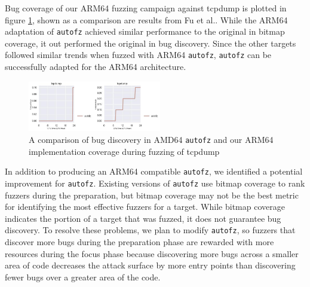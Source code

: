 Bug coverage of our ARM64 fuzzing campaign against tcpdump is plotted in figure \ref{figs:tcp_compare_orig_arm64_ub.png}, 
shown as a comparison are results from Fu et al.\cite{fu_autofz_2023}. While the ARM64 adaptation of \texttt{autofz} achieved similar
performance to the original in bitmap coverage, it out performed the original in bug discovery. Since the other targets followed similar trends
when fuzzed with ARM64 \texttt{autofz}, \texttt{autofz} can be successfully adapted for the ARM64 architecture.

\begin{figure}
    \includegraphics[width=0.52\textwidth]{figs/tcpdump_compare_orig_arm64_ub.png}
    \centering
    \caption{A comparison of bug discovery in AMD64 \texttt{autofz} and our ARM64 implementation
    coverage during fuzzing of tcpdump}
    \label{figs:tcp_compare_orig_arm64_ub.png}
\end{figure}

In addition to producing an ARM64 compatible \texttt{autofz}, we identified a potential improvement for \texttt{autofz}.
Existing versions of \texttt{autofz} use bitmap coverage to rank fuzzers during the preparation, but bitmap
coverage may not be the best metric for identifying the most effective fuzzers for a target. While
bitmap coverage indicates the portion of a target that was fuzzed, it does not guarantee bug discovery.
To resolve these problems, we plan to modify \texttt{autofz}, so fuzzers that discover more bugs during the
preparation phase are rewarded with more resources during the focus phase because discovering more bugs
across a smaller area of code decreases the attack surface by more entry points than discovering fewer
bugs over a greater area of the code.
